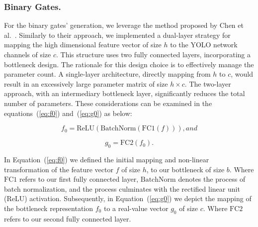 \documentclass[runningheads]{llncs}
\begin{document}
\subsubsection*{Binary Gates.} For the binary gates’ generation, we leverage the method proposed by Chen et al.~\cite{chen2019you}. Similarly to their approach, we implemented a dual-layer strategy for mapping the high dimensional feature vector of size \( h \) to the YOLO network channels of size \( c \). This structure uses two fully connected layers, incorporating a bottleneck design. The rationale for this design choice is to effectively manage the parameter count. A single-layer architecture, directly mapping from \( h \) to \( c \), would result in an excessively large parameter matrix of size \( h \times c \). The two-layer approach, with an intermediary bottleneck layer, significantly reduces the total number of parameters. These considerations can be examined in the equations~(\ref{eq:f0}) and~(\ref{eq:g0}) as below:

\begin{equation}
f_0 = \text{ReLU}(\text{BatchNorm}(\text{FC1}(f))), and \label{eq:f0}
\end{equation}

\begin{equation}
g_0 = \text{FC2}(f_0). \label{eq:g0}
\end{equation}

In Equation~(\ref{eq:f0}) we defined the initial mapping and non-linear transformation of the feature vector \( f \) of size \( h \), to our bottleneck of size \( b \). Where \(\text{FC1}\) refers to our first fully connected layer, \(\text{BatchNorm}\) denotes the process of batch normalization, and the process culminates with the rectified linear unit (ReLU) activation.
Subsequently, in Equation~(\ref{eq:g0}) we depict the mapping of the bottleneck representation \( f_0 \) to a real-value vector \( g_0 \) of size \( c \). Where \(\text{FC2}\) refers to our second fully connected layer.
\end{document}

